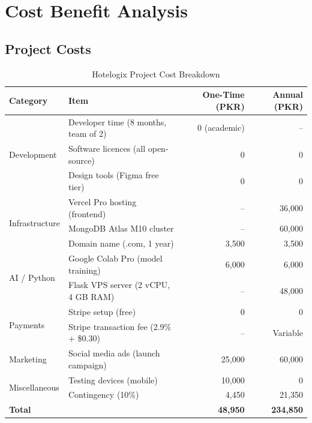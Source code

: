 \documentclass[12pt,a4paper]{report}
\begin{document}
\chapter{Cost Benefit Analysis}

\section{Project Costs}

\begin{table}[H]
\centering
\begin{tabularx}{\textwidth}{l X r r}
\toprule
\textbf{Category} & \textbf{Item} & \textbf{One-Time (PKR)} & \textbf{Annual (PKR)} \\
\midrule
\multirow{3}{*}{Development}
  & Developer time (8 months, team of 2) & 0 (academic) & -- \\
  & Software licences (all open-source)  & 0            & 0  \\
  & Design tools (Figma free tier)       & 0            & 0  \\
\midrule
\multirow{3}{*}{Infrastructure}
  & Vercel Pro hosting (frontend)        & --           & 36,000 \\
  & MongoDB Atlas M10 cluster            & --           & 60,000 \\
  & Domain name (.com, 1 year)           & 3,500        & 3,500  \\
\midrule
\multirow{2}{*}{AI / Python}
  & Google Colab Pro (model training)    & 6,000        & 6,000  \\
  & Flask VPS server (2 vCPU, 4 GB RAM)  & --           & 48,000 \\
\midrule
\multirow{2}{*}{Payments}
  & Stripe setup (free)                  & 0            & 0      \\
  & Stripe transaction fee (2.9\% + \$0.30) & --        & Variable \\
\midrule
Marketing
  & Social media ads (launch campaign)   & 25,000       & 60,000 \\
\midrule
\multirow{2}{*}{Miscellaneous}
  & Testing devices (mobile)             & 10,000       & 0      \\
  & Contingency (10\%)                   & 4,450        & 21,350 \\
\midrule
\textbf{Total}    &                                      & \textbf{48,950} & \textbf{234,850} \\
\bottomrule
\end{tabularx}
\caption{Hotelogix Project Cost Breakdown}
\end{table}
\end{document}
